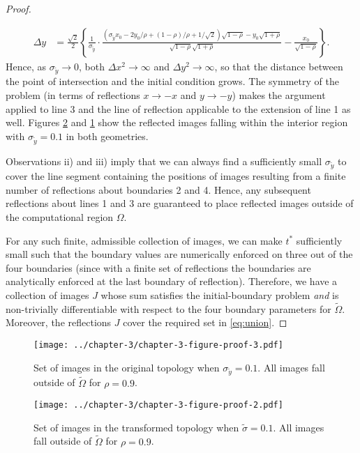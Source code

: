 \begin{proof}
\begin{enumerate}
\begin{align*}
      \Delta y &= \frac{\sqrt{2}}{2} \left\{ \frac{1}{\sigma_{\tilde{y}}}\cdot\frac{(\sigma_{\tilde{y}}x_0 - 2y_0/\rho + (1-\rho)/\rho + 1/\sqrt{2})\sqrt{1-\rho} - y_0\sqrt{1+\rho}}{\sqrt{1-\rho}\sqrt{1+\rho}}- \frac{x_0}{\sqrt{1-\rho}} \right\}.
    \end{align*}
    Hence, as $\sigma_{\tilde{y}} \to 0$, both $\Delta x^2 \to \infty$ and
    $\Delta y^2 \to \infty$, so that the distance between the point of
    intersection and the initial condition grows. The symmetry of the problem (in
    terms of reflections $x \to -x$ and $y \to -y$) makes the argument
    applied to line 3 and the line of reflection applicable to the
    extension of line 1 as well. Figures \ref{fig:proof-2} and
    \ref{fig:proof-3} show the reflected images falling within the
    interior region with $\sigma_{\tilde{y}} = 0.1$ in both geometries.
  \end{enumerate}
  Observations ii) and iii) imply that we can always find a
  sufficiently small $\sigma_{\tilde{y}}$ to cover the line segment
  containing the positions of images resulting from a finite number of
  reflections about boundaries 2 and 4.  Hence, any subsequent
  reflections about lines 1 and 3 are guaranteed to place reflected
  images outside of the computational region $\Omega$.

  For any such finite, admissible collection of images, we can make
  $t^*$ sufficiently small such that the boundary values are
  numerically enforced on three out of the four boundaries (since with
  a finite set of reflections the boundaries are analytically enforced at the
  last boundary of reflection). Therefore, we have a collection of
  images $J$ whose sum satisfies the initial-boundary problem
  \textit{and} is non-trivially differentiable with respect to the four
  boundary parameters for $\tilde{\Omega}$. Moreover, the reflections
  $J$ cover the required set in \eqref{eq:union}.
\end{proof}

\begin{figure}
  \centering
  \texttt{[image: ../chapter-3/chapter-3-figure-proof-3.pdf]}
  \caption{Set of images in the original topology when
    $\sigma_{\tilde{y}} = 0.1$. All images fall outside of
    $\tilde{\Omega}$ for $\rho = 0.9$.}
  \label{fig:proof-3}
\end{figure}


\begin{figure}
      \centering
      \texttt{[image: ../chapter-3/chapter-3-figure-proof-2.pdf]}
      \caption{Set of images in the transformed topology when
        $\tilde{\sigma} = 0.1$. All images fall outside of $\tilde{\Omega}$
        for $\rho = 0.9$.}
      \label{fig:proof-2}
\end{figure}

